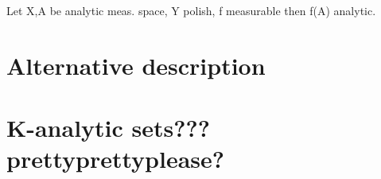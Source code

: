 \documentclass[10pt, a4paper, titlepage]{article}
\numberwithin{equation}{section}
\begin{document}
\begin{definition}
	
\end{definition}

\begin{theorem}
	Let X,A be analytic meas. space, Y polish, f measurable then f(A) analytic.
\end{theorem}




\section{Alternative description}




\section{K-analytic sets??? prettyprettyplease?}
































\vspace{\fill}
\nocite{*}
\printbibliography{}
\end{document}
